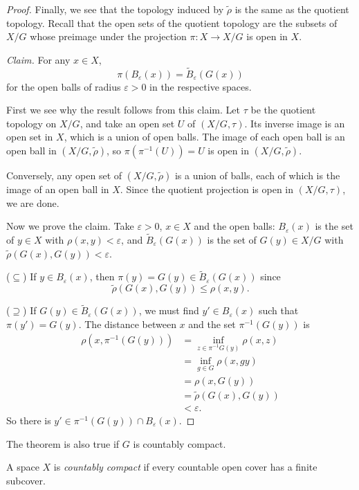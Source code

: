 \begin{proof}
Finally, we see that the topology
induced by $\tilde{\rho}$ is the same
as the quotient topology. Recall that
the open sets of the quotient topology
are the subsets of $X/G$ whose preimage
under the projection $\pi:X\to X/G$ is
open in $X$.

{\it Claim.} For any $x\in X$,
$$
\pi(B_\varepsilon(x))
=\tilde{B}_\varepsilon(G(x))
$$
for the open balls of radius
$\varepsilon>0$ in the respective
spaces.

First we see why the result follows
from this claim. Let $\tau$ be the
quotient topology on $X/G$, and take an
open set $U$ of $(X/G,\tau)$. Its
inverse image is an open set in $X$,
which is a union of open balls. The
image of each open ball is an open ball
in $(X/G,\tilde{\rho})$, so
$\pi(\pi^{-1}(U))=U$ is open in
$(X/G,\tilde{\rho})$.

Conversely, any open set of
$(X/G,\tilde{\rho})$ is a union of
balls, each of which is the image of an
open ball in $X$. Since the quotient
projection is open in $(X/G,\tau)$, we
are done.

Now we prove the claim. Take
$\varepsilon>0$, $x\in X$ and the open
balls: $B_\varepsilon(x)$ is the set of
$y\in X$ with $\rho(x,y)<\varepsilon$,
and $\tilde{B}_\varepsilon(G(x))$ is
the set of $G(y)\in X/G$ with
$\tilde{\rho}(G(x),G(y))<\varepsilon$.

($\subseteq$) If
$y\in B_\varepsilon(x)$, then
$\pi(y)=G(y)
\in\tilde{B}_\varepsilon(G(x))$ since
$$
\tilde{\rho}(G(x),G(y))
\leq\rho(x,y).
$$

($\supseteq$) If
$G(y)\in\tilde{B}_\varepsilon(G(x))$,
we must find
$y'\in B_\varepsilon(x)$ such that
$\pi(y')=G(y)$. The distance between
$x$ and the set $\pi^{-1}(G(y))$ is
$$
\begin{aligned}
\rho(x,\pi^{-1}(G(y)))
&=\inf_{z\in\pi^{-1}G(y)}\rho(x,z) \\
&=\inf_{g\in G}\rho(x,gy) \\
&=\rho(x,G(y)) \\
&=\tilde{\rho}(G(x),G(y)) \\
&<\varepsilon.
\end{aligned}
$$
So there is
$y'\in\pi^{-1}(G(y))
\cap B_\varepsilon(x)$.
\end{proof}

The theorem is also true if $G$ is
countably compact.

\begin{definition}
\label{definition-countably-compact}
A space $X$ is {\it countably compact}
if every countable open cover has a
finite subcover.
\end{definition}

